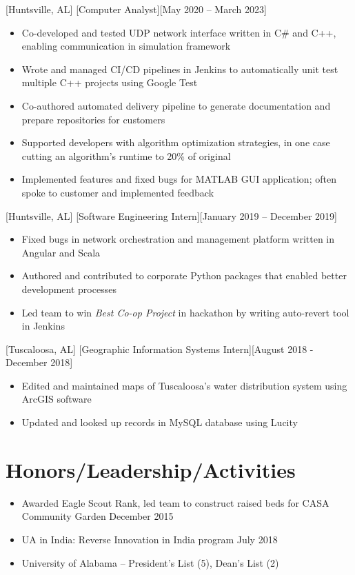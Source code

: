 \documentclass[hidelinks, 11pt]{article}
\begin{document}
[Huntsville, AL]
[Computer Analyst][May 2020 -- March 2023]

\begin{itemize}
	\item Co-developed and tested UDP network interface written in C\# and C++, enabling communication in simulation framework
	\item Wrote and managed CI/CD pipelines in Jenkins to automatically unit test multiple C++ projects using Google Test
	\item Co-authored automated delivery pipeline to generate documentation and prepare repositories for customers
	\item Supported developers with algorithm optimization strategies, in one case cutting an algorithm's runtime to 20\% of original
	\item Implemented features and fixed bugs for MATLAB GUI application; often spoke to customer and implemented feedback
\end{itemize}

[Huntsville, AL]
[Software Engineering Intern][January 2019 -- December 2019]

\begin{itemize}
	\item Fixed bugs in network orchestration and management platform written in Angular and Scala
	\item Authored and contributed to corporate Python packages that enabled better development processes
	\item Led team to win \textit{Best Co-op Project} in hackathon by writing auto-revert tool in Jenkins
\end{itemize}

[Tuscaloosa, AL]
[Geographic Information Systems Intern][August 2018 - December 2018]

\begin{itemize}
	\item Edited and maintained maps of Tuscaloosa’s water distribution system using ArcGIS software
	\item Updated and looked up records in MySQL database using Lucity
\end{itemize}

\section{Honors/Leadership/Activities}

\begin{itemize}
	\item Awarded Eagle Scout Rank, led team to construct raised beds for CASA Community Garden \hfill December 2015
	\item UA in India: Reverse Innovation in India program \hfill July 2018
	\item University of Alabama -- President's List (5), Dean's List (2)
\end{itemize}
\end{document}
